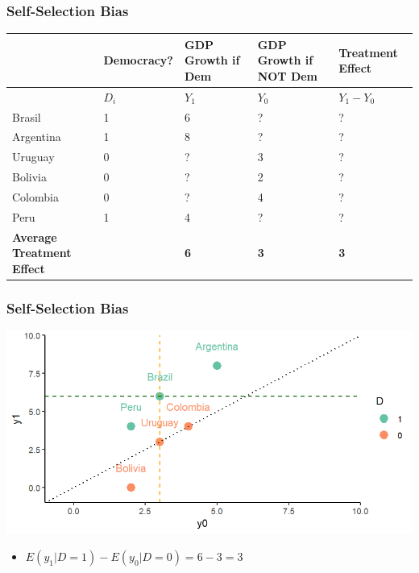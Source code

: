 \documentclass[xcolor=x11names,compress]{beamer}\usepackage[]{graphicx}\usepackage[]{color}
\makeatletter
\def\maxwidth{ %
  \ifdim\Gin@nat@width>\linewidth
    \linewidth
  \else
    \Gin@nat@width
  \fi
}
\newenvironment{knitrout}{}{} %
\renewcommand{\(}{\begin{columns}}
\renewcommand{\)}{\end{columns}}
\newcommand{\<}[1]{\begin{column}{#1}}
\renewcommand{\>}{\end{column}}
\makeatother
\begin{document}
\begin{frame}
\frametitle{Self-Selection Bias}
\footnotesize
\footnotesize
\begin{table}[htbp]
  \centering
    \begin{tabular}{|p{1.8cm}|p{1.8cm}|p{1.8cm}|p{1.8cm}|p{1.8cm}|}
    \hline
          & \multicolumn{1}{p{1.8cm}|}{Democracy?} & \multicolumn{1}{p{1.8cm}|}{GDP Growth if Dem} & \multicolumn{1}{p{1.8cm}|}{GDP Growth if NOT Dem} & \textbf{Treatment Effect} \bigstrut\\
    \hline
          \multicolumn{1}{|p{1.8cm}|}{} & \multicolumn{1}{p{1.8cm}|}{$D_i$} & \multicolumn{1}{p{2cm}|}{$Y_1$} & \multicolumn{1}{p{2.2cm}|}{$Y_0$} & \multicolumn{1}{p{1.8cm}|}{$Y_{1} - Y_{0}$} \bigstrut\\
    \hline
    Brasil & 1 & 6     & ?     & ? \bigstrut\\
    \hline
    Argentina & 1 & 8    & ?     & ? \bigstrut\\
    \hline
    Uruguay & 0 & ? & 3 & ?  \bigstrut\\
    \hline
    Bolivia & 0 & ?     & 2     & ? \bigstrut\\
    \hline
    Colombia & 0 & ?    & 4    & ? \bigstrut\\
    \hline
    Peru & 1 & 4     & ?     & ? \bigstrut\\
    \hline
    \textbf{Average Treatment Effect} & & \textbf{6} & \textbf{3} & \textbf{3} \bigstrut\\
    \hline
    \end{tabular}%
  \label{tab:addlabel}%
\end{table}%
\normalsize
\end{frame}

\begin{frame}
\frametitle{Self-Selection Bias}
\begin{knitrout}
\color{fgcolor}
\includegraphics[width=\maxwidth]{figure/Chart_3-1} 

\end{knitrout}
\begin{itemize}
\item $E(y_1|D=1)-E(y_0|D=0)= 6 - 3 = 3$
\end{itemize}
\end{frame}
\end{document}
